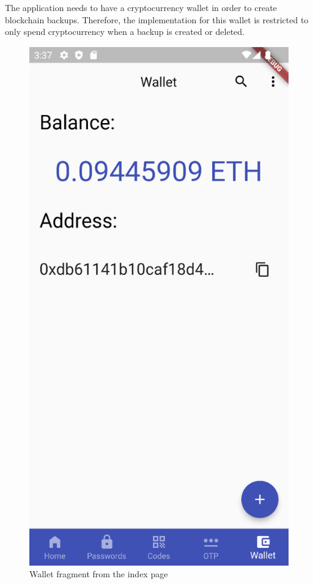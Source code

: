 \documentclass[a4paper,12pt]{report}
\begin{document}
The application needs to have a cryptocurrency wallet in order to create
blockchain backups. Therefore, the implementation for this wallet is restricted
to only spend cryptocurrency when a backup is created or deleted.

\begin{figure}[H]
    \centering
    \includegraphics[scale=0.45]{images/app/wallet.png}
    \caption{Wallet fragment from the index page}\label{fig:wallet}
\end{figure}
\end{document}

